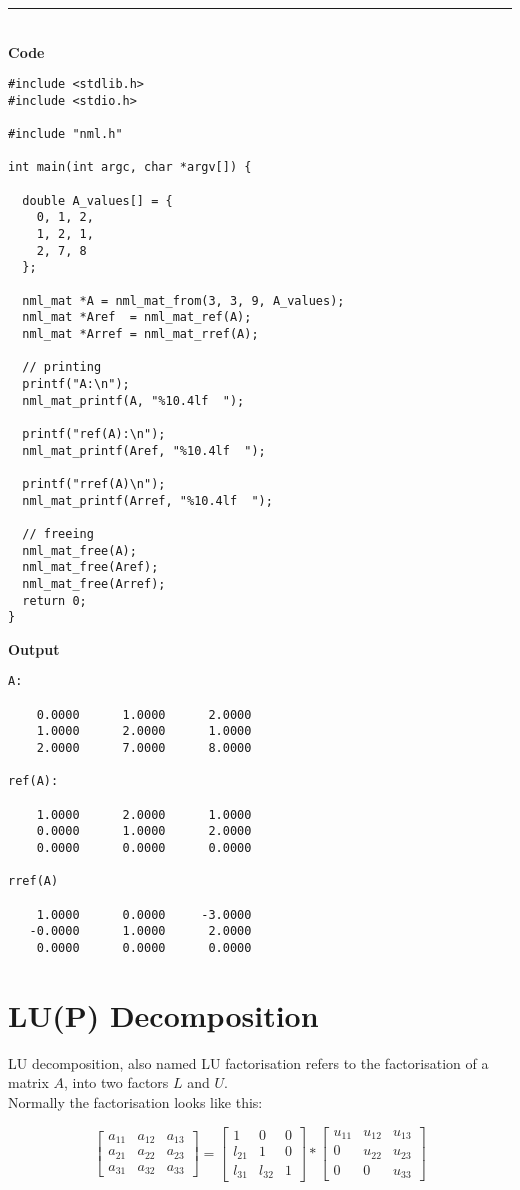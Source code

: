 \rule{80mm}{0.5pt}\\
{\bf Code}
\begin{verbatim}
#include <stdlib.h>
#include <stdio.h>

#include "nml.h"

int main(int argc, char *argv[]) {

  double A_values[] = {
    0, 1, 2,
    1, 2, 1,
    2, 7, 8
  };

  nml_mat *A = nml_mat_from(3, 3, 9, A_values);
  nml_mat *Aref  = nml_mat_ref(A);
  nml_mat *Arref = nml_mat_rref(A);

  // printing
  printf("A:\n");                       
  nml_mat_printf(A, "%10.4lf  ");

  printf("ref(A):\n");                       
  nml_mat_printf(Aref, "%10.4lf  ");

  printf("rref(A)\n");                       
  nml_mat_printf(Arref, "%10.4lf  ");

  // freeing
  nml_mat_free(A); 
  nml_mat_free(Aref);
  nml_mat_free(Arref);
  return 0;
}
\end{verbatim}

\hsep
{\bf Output}
\begin{verbatim}
A:

    0.0000      1.0000      2.0000  
    1.0000      2.0000      1.0000  
    2.0000      7.0000      8.0000  

ref(A):

    1.0000      2.0000      1.0000  
    0.0000      1.0000      2.0000  
    0.0000      0.0000      0.0000  

rref(A)

    1.0000      0.0000     -3.0000  
   -0.0000      1.0000      2.0000  
    0.0000      0.0000      0.0000  
\end{verbatim}


\section{LU(P) Decomposition}

LU decomposition, also named LU factorisation refers to the factorisation of a matrix $A$, into two factors $L$ and $U$.
\\

Normally the factorisation looks like this:

$$
\begin{bmatrix}
a_{11} & a_{12} & a_{13} \\
a_{21} & a_{22} & a_{23} \\
a_{31} & a_{32} & a_{33} 
\end{bmatrix}
=
\begin{bmatrix}
1 & 0 & 0 \\
l_{21} & 1 & 0 \\
l_{31} & l_{32} & 1
\end{bmatrix} 
* 
\begin{bmatrix}
u_{11} & u_{12} & u_{13} \\
0 & u_{22} & u_{23} \\
0 & 0 & u_{33}
\end{bmatrix}
$$

